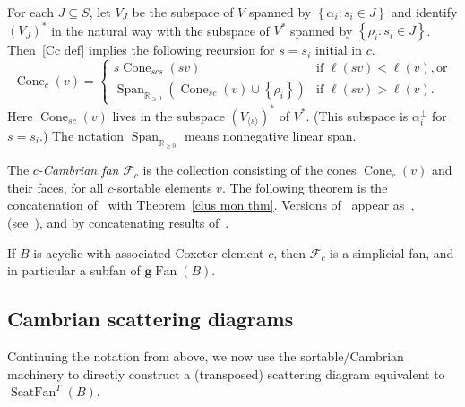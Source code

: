 \documentclass[ALCO,ThmDefs,Unicode,epreuves]{cedram}
\DeclareMathOperator{\Cone}{Cone}
\DeclareMathOperator{\Span}{Span}
\DeclareMathOperator{\Fan}{Fan}
\DeclareMathOperator{\ScatFan}{ScatFan}
\newcommand{\gFan}{\g\!\Fan}
\newcommand{\newword}[1]{\emph{#1}}
\newcommand{\reals}{\mathbb R}
\newcommand{\set}[1]{{\left\lbrace #1 \right\rbrace}}
\newcommand{\br}[1]{{\langle #1 \rangle}}
\newcommand{\F}{{\mathcal F}}
\newcommand{\g}{\mathbf{g}}
\begin{document}
For each $J\subseteq S$, let $V_J$ be the subspace of $V$ spanned by $\set{\alpha_i:s_i\in J}$ and identify $(V_J)^*$ in the natural way with the subspace of $V^*$ spanned by $\set{\rho_i:s_i\in J}$.
Then~\eqref{Cc def} implies the following recursion for $s=s_i$ initial in $c$.
\begin{equation}\label{cone recur}
\Cone_c(v)=\begin{cases}
s\Cone_{scs}(sv)&\text{if }\ell(sv)<\ell(v),\text{or}\\
\Span_{\reals_{\ge0}}(\Cone_{sc}(v)\cup\set{\rho_i})&\text{if }\ell(sv)>\ell(v).
\end{cases}
\end{equation}
Here $\Cone_{sc}(v)$ lives in the subspace $(V_\br{s})^*$ of $V^*$.
(This subspace is $\alpha_i^\perp$ for $s=s_i$.)
The notation $\Span_{\reals_{\ge0}}$ means nonnegative linear span.

The \newword{$c$-Cambrian fan} $\F_c$ is the collection consisting of the cones $\Cone_c(v)$ and their faces, for all $c$-sortable elements $v$.
The following theorem is the concatenation of~\cite[Corollary~5.15]{framework} with Theorem~\ref{clus mon thm}.
Versions of~\cite[Corollary~5.15]{framework} appear as~\cite[Theorem~9.1]{typefree},~\cite[Theorem~1.10]{YZ} (see~\cite[Remark~6.1]{YZ}), and by concatenating results of~\cite{con_app,sort_camb}.

\begin{theorem}\label{camb fan thm}
If $B$ is acyclic with associated Coxeter element $c$, then $\F_c$ is a simplicial fan, and in particular a subfan of $\gFan(B)$.
\end{theorem}

\subsection{Cambrian scattering diagrams}
Continuing the notation from above, we now use the sortable/Cambrian machinery to directly construct a (transposed) scattering diagram equivalent to $\ScatFan^T(B)$.
\end{document}
